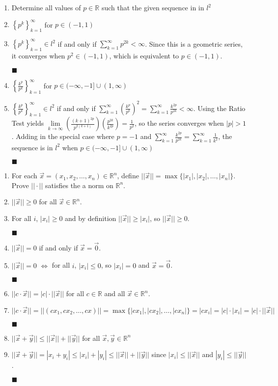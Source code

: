 \documentclass[a4paper,12pt]{report}
\newcommand{\bb}[1]{\mathbb{#1}}
\newcommand{\problem}[3]{
	\begin{enumerate}
		\item[\bf{Problem #1}] #2 
		#3
	\end{enumerate}
}
\newcommand{\subproof}[3]{
	\item[#1] #2
	\item[\bf{Proof:}] 
	#3 
	\begin{flushright}
		$\blacksquare$
	\end{flushright}
}
\begin{document}
\problem{31}{
	Determine all values of $p \in \bb{R}$ such that the given sequence in in $l^2$
}{
	\subproof{(a)}{
		$\left\{p^k\right\}_{k=1}^{\infty}$ for $p \in (-1,1)$
	}{
		$\left\{p^k\right\}_{k=1}^{\infty} \in l^2$ if and only if $\sum\limits_{k=1}^{\infty}p^{2k} < \infty$. Since this is a geometric series, it converges when $p^2 \in (-1,1)$, which is equivalent to $p \in (-1,1)$.
	}
	\subproof{(a)}{
		$\left\{\frac{k^p}{p^k}\right\}_{k=1}^{\infty}$ for $p \in (-\infty,-1]\cup(1,\infty)$
	}{
		$\left\{\frac{k^p}{p^k}\right\}_{k=1}^{\infty} \in l^2$ if and only if $\sum\limits_{k=1}^{\infty}\left(\frac{k^p}{p^k}\right)^2 = \sum\limits_{k=1}^{\infty}\frac{k^{2p}}{p^{2k}} < \infty$. Using the Ratio Test yields $\lim\limits_{k \to \infty}\left(\frac{(k+1)^{2p}}{p^{2(k+1)}}\right)\left(\frac{p^{2k}}{k^{2p}}\right) = \frac{1}{p^2}$, so the series converges when $|p| > 1$. Adding in the special case where $p = -1$ and $\sum\limits_{k=1}^{\infty}\frac{k^{2p}}{p^{2k}} = \sum\limits_{k=1}^{\infty}\frac{1}{k^2}$, the sequence is in $l^2$ when $p \in (-\infty,-1]\cup(1,\infty)$
	}
}

\pagebreak

\problem{32}{
	For each $\vec{x} = (x_1, x_2, \ldots, x_n) \in \bb{R}^n$, define $||\vec{x}|| = \max\{|x_1|, |x_2|, \ldots, |x_n|\}$. Prove $||\cdot||$ satisfies the  a norm on $\bb{R}^n$.
}{
	\subproof{(a)}{
		$||\vec{x}|| \geqslant 0$ for all $\vec{x} \in \bb{R}^n$.
	}{
		For all $i$, $|x_i| \geqslant 0$ and by definition $||\vec{x}|| \geqslant |x_i|$, so $||\vec{x}|| \geqslant 0$.
	}
	\subproof{(b)}{
		$||\vec{x}|| = 0$ if and only if $\vec{x} = \vec{0}$.
	}{
		$||\vec{x}|| = 0$ $\Leftrightarrow$ for all $i$, $|x_i| \leqslant 0$, so $|x_i| = 0$ and $\vec{x} = \vec{0}$.
	}
	\subproof{(c)}{
		$||c \cdot \vec{x}|| = |c| \cdot ||\vec{x}||$ for all $c \in \bb{R}$ and all $\vec{x} \in \bb{R}^n$.
	}{
		$||c \cdot \vec{x}|| = ||(cx_1, cx_2, \ldots, cx)|| = \max\{|cx_1|, |cx_2|, \ldots, |cx_n|\} = |cx_i| = |c|\cdot|x_i| = |c|\cdot||\vec{x}||$
	}
	\subproof{(d)}{
		$||\vec{x} + \vec{y}|| \leqslant ||\vec{x}|| + ||\vec{y}||$ for all $\vec{x},\vec{y} \in \bb{R}^n$
	}{
		$||\vec{x} + \vec{y}|| = |x_i + y_i| \leqslant |x_i| + |y_i| \leqslant ||\vec{x}|| + ||\vec{y}||$ since $|x_i| \leqslant ||\vec{x}||$ and $|y_i| \leqslant ||\vec{y}||$.
	}
}
\end{document}
